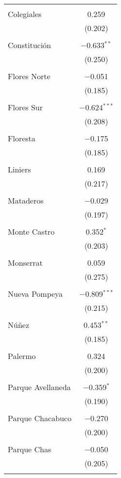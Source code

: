 \begin{table}[!htbp]
\begin{tabular}{@{\extracolsep{5pt}}lc}
  & \\ 
 Colegiales & 0.259 \\ 
  & (0.202) \\ 
  & \\ 
 Constitución & $-$0.633$^{**}$ \\ 
  & (0.250) \\ 
  & \\ 
 Flores Norte & $-$0.051 \\ 
  & (0.185) \\ 
  & \\ 
 Flores Sur & $-$0.624$^{***}$ \\ 
  & (0.208) \\ 
  & \\ 
 Floresta & $-$0.175 \\ 
  & (0.185) \\ 
  & \\ 
 Liniers & 0.169 \\ 
  & (0.217) \\ 
  & \\ 
 Mataderos & $-$0.029 \\ 
  & (0.197) \\ 
  & \\ 
 Monte Castro & 0.352$^{*}$ \\ 
  & (0.203) \\ 
  & \\ 
 Monserrat & 0.059 \\ 
  & (0.275) \\ 
  & \\ 
 Nueva Pompeya & $-$0.809$^{***}$ \\ 
  & (0.215) \\ 
  & \\ 
 Núñez & 0.453$^{**}$ \\ 
  & (0.185) \\ 
  & \\ 
 Palermo & 0.324 \\ 
  & (0.200) \\ 
  & \\ 
 Parque Avellaneda & $-$0.359$^{*}$ \\ 
  & (0.190) \\ 
  & \\ 
 Parque Chacabuco & $-$0.270 \\ 
  & (0.200) \\ 
  & \\ 
 Parque Chas & $-$0.050 \\ 
  & (0.205) \\ 
  & \\ 

\end{tabular}
\end{table}
